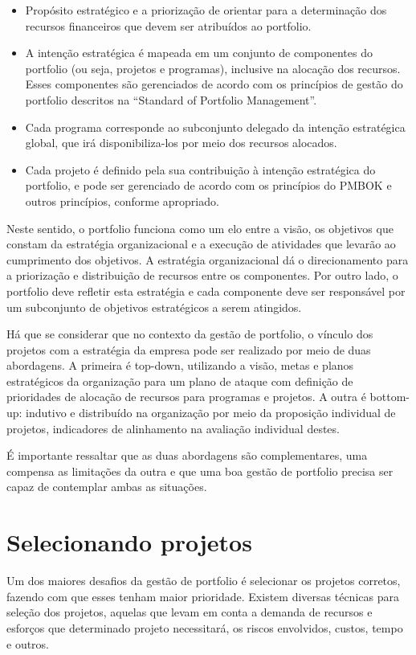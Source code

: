\documentclass[12pt,a4paper,ruledheader,tocpage=prefix,floatnumber=continuous,pagestart=folhaderosto,font=times]{abnt}
\begin{document}
\begin{itemize}
 \item Propósito estratégico e a priorização de orientar para a determinação dos recursos financeiros que devem 
ser atribuídos ao portfolio.
  \item A intenção estratégica é mapeada em um conjunto de componentes do portfolio (ou seja, projetos e programas), inclusive na alocação 
dos recursos. Esses componentes são gerenciados de acordo com os princípios de gestão do portfolio descritos na ``Standard of Portfolio Management''.
  \item Cada programa corresponde ao subconjunto delegado da intenção estratégica global, que irá disponibiliza-los por meio dos recursos alocados.
  \item Cada projeto é definido pela sua contribuição à intenção estratégica do portfolio, e
pode ser gerenciado de acordo com os princípios do PMBOK e outros princípios, conforme apropriado.
\end{itemize}

Neste sentido, o portfolio funciona como um elo entre a visão, os objetivos que constam da estratégia organizacional e a execução de atividades que 
levarão ao cumprimento dos objetivos. A estratégia organizacional dá o direcionamento para a priorização e distribuição de recursos entre os componentes. 
Por outro lado, o portfolio deve refletir esta estratégia e cada componente deve ser responsável por um subconjunto de objetivos estratégicos a serem 
atingidos.

Há que se considerar que no contexto da gestão de portfolio, o vínculo dos projetos com a estratégia da empresa pode ser realizado por meio de duas 
abordagens. A primeira é top-down, utilizando a visão, metas e planos estratégicos da organização para um plano de ataque com definição de prioridades 
de alocação de recursos para programas e projetos. A outra é bottom-up: indutivo e distribuído na organização por meio da proposição individual de 
projetos, indicadores de alinhamento na avaliação individual destes. 

É importante ressaltar que as duas abordagens são complementares, uma compensa as limitações da outra e que uma boa gestão de portfolio precisa ser 
capaz de contemplar ambas as situações.

\section{Selecionando projetos}
Um dos maiores desafios da gestão de portfolio é selecionar os projetos corretos, fazendo com que esses tenham maior prioridade. Existem diversas 
técnicas para seleção dos projetos, aquelas que levam em conta a demanda de recursos e esforços que determinado projeto necessitará, os riscos envolvidos,
custos, tempo e outros. 
\end{document}
